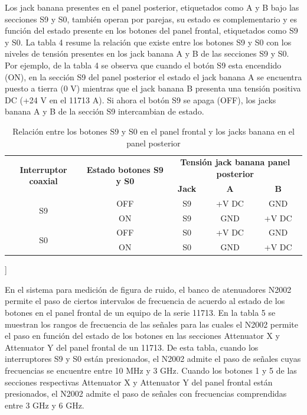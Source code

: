 Los jack banana presentes en el panel posterior, etiquetados como A y B bajo las secciones S9 y S0, también operan por parejas, su estado es complementario y es función del estado presente en los botones del panel frontal, etiquetados como S9 y S0. La tabla 4 resume la relación que existe entre los botones S9 y S0 con los niveles de tensión presentes en los jack banana A y B de las secciones S9 y S0. Por ejemplo, de la tabla 4 se observa que cuando el botón S9 esta encendido (ON), en la sección S9 del panel posterior el estado el jack banana A  se encuentra puesto a tierra (0 V) mientras que el jack banana B presenta una tensión positiva DC (+24 V en el 11713 A). Si ahora el botón S9 se apaga (OFF), los jacks banana A y B de la sección S9 intercambian de estado.

\begin{table}[h!]
	\begin{tabular}{|c|c|c|c|c|}
		\hline
		\multirow{2}{*}{\bfseries Interruptor coaxial} & \multirow{2}{*}{\bfseries Estado botones S9 y S0} & \multicolumn{3}{c}{\bfseries Tensión jack banana panel posterior} \\
		\cline{3-5}
			& 	&	\textbf{Jack}	&	\textbf{A}	&	\textbf{B}  \\
		\hline
		\multirow{2}{*}{S9} & OFF 	& S9 	& +\si{\volt} DC 	& GND \\
		\cline{2-5}
							& ON	& S9	& GND				& +\si{\volt} DC \\
		\hline
		\multirow{2}{*}{S0} & OFF 	& S0 	& +\si{\volt} DC 	& GND \\
		\cline{2-5}
							& ON	& S0	& GND				& +\si{\volt} DC \\
		\hline								
		
	\end{tabular}
	\caption{Relación entre los botones S9 y S0 en el panel frontal y los jacks banana en el panel posterior}
	\label{Tab:RelacionBotonesJackBanana11713}
\end{table}]

En el sistema para medición de figura de ruido, el banco de atenuadores N2002 permite el paso de ciertos intervalos de frecuencia de acuerdo al estado de los botones en el panel frontal de un equipo de la serie 11713.   En la tabla 5 se muestran los rangos de frecuencia de las señales para las cuales el N2002 permite el paso en función del estado de los botones en las secciones Attenuator X y Attenuator Y del panel frontal de un 11713. De esta tabla, cuando los interruptores S9 y S0 están presionados, el N2002 admite el paso de señales cuyas frecuencias se encuentre entre 10 MHz y 3 GHz. Cuando los botones 1 y 5 de las secciones respectivas Attenuator X y  Attenuator Y del panel frontal están presionados, el N2002 admite el paso de señales con frecuencias comprendidas entre 3 GHz y 6 GHz.

